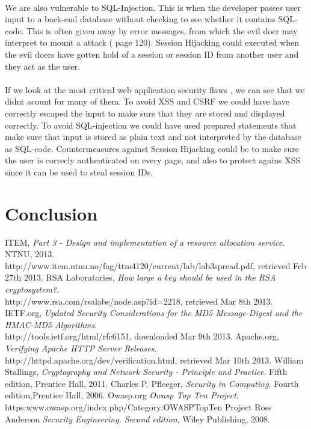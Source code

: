 \documentclass[a4paper,11pt]{article}
\begin{document}
\paragraph{}We are also vulnerable to SQL-Injection. This is when the developer passes user input to a back-end database without checking to see whether it contains SQL-code. This is often given away by error messages, from which the evil doer may interpret to mount a attack (\cite{8} page 120). Session Hijacking could executed when the evil doers have gotten hold of a session or session ID from another user and they act as the user.
\paragraph{}If we look at the most critical web application security flaws \cite{7}, we can see that we didnt acount for many of them. To avoid XSS and CSRF we could have have correctly escaped the input to make sure that they are stored and displayed correctly. To avoid SQL-injection we could have used prepared statements that make sure that input is stored as plain text and not interpreted by the database as SQL-code. Countermeasures against Session Hijacking could be to make sure the user is correcly authenticated on every page, and also to protect agains XSS since it can be used to steal session IDs.
\section*{Conclusion}
\begin{thebibliography}{9}
ITEM, 
	\emph{Part 3 - Design and implementation of a resource allocation service}.
	NTNU, 2013. \\http://www.item.ntnu.no/fag/ttm4120/current/lab/lab3spread.pdf, retrieved Feb 27th 2013.
RSA Laboratories, \emph{How large a key should be used in the RSA cryptosystem?}.\\ http://www.rsa.com/rsalabs/node.asp?id=2218, retrieved Mar 8th 2013.	
IETF.org, \emph{Updated Security Considerations for the MD5 Message-Digest and the HMAC-MD5 Algorithms}.\\ http://tools.ietf.org/html/rfc6151, downloaded Mar 9th 2013.
 Apache.org, \emph{Verifying Apache HTTP Server Releases}.\\ http://httpd.apache.org/dev/verification.html, retrieved Mar 10th 2013.
William Stallings, \emph{Cryptography and Network Security - Principle and Practice}. Fifth edition, Prentice Hall, 2011.
Charles P. Pfleeger, \emph{Security in Computing}. Fourth edition,Prentice Hall, 2006.
Owasp.org \emph{Owasp Top Ten Project}.\\ https:www.owasp.org/index.php/Category:OWASP\textunderscore Top\textunderscore Ten \textunderscore Project
Ross Anderson \emph{Security Engineering. Second edition}, Wiley Publishing, 2008.
\end{thebibliography}
\listoffigures
\end{document}
